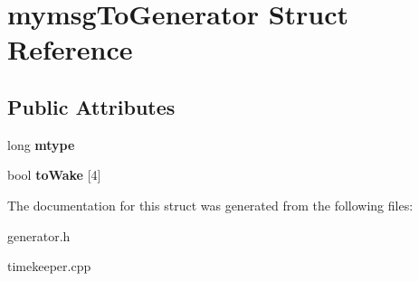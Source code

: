 \hypertarget{structmymsgToGenerator}{\section{mymsg\-To\-Generator \-Struct \-Reference}
\label{structmymsgToGenerator}
}
\subsection*{\-Public \-Attributes}
\begin{DoxyCompactItemize}
\item 
\hypertarget{structmymsgToGenerator_afc9b91e083ab1759ecf12877087c6dd8}{long {\bfseries mtype}}\label{structmymsgToGenerator_afc9b91e083ab1759ecf12877087c6dd8}

\item 
\hypertarget{structmymsgToGenerator_a82e8022ff805113f3be6126fdf9b26c0}{bool {\bfseries to\-Wake} \mbox{[}4\mbox{]}}\label{structmymsgToGenerator_a82e8022ff805113f3be6126fdf9b26c0}

\end{DoxyCompactItemize}


\-The documentation for this struct was generated from the following files\-:\begin{DoxyCompactItemize}
\item 
generator.\-h\item 
timekeeper.\-cpp\end{DoxyCompactItemize}
